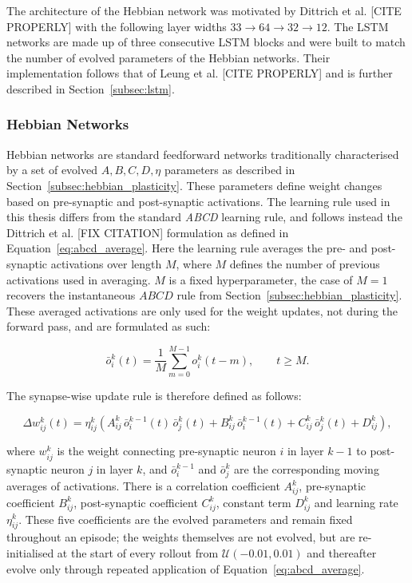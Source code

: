 \documentclass{article} %
\begin{document}
The architecture of the Hebbian network was motivated by Dittrich et al. [CITE PROPERLY] with the following layer widths $33 \rightarrow 64 \rightarrow 32 \rightarrow 12$. The LSTM networks are made up of three consecutive LSTM blocks and were built to match the number of evolved parameters of the Hebbian networks. Their implementation follows that of Leung et al. [CITE PROPERLY] and is further described in Section~\ref{subsec:lstm}.

\subsubsection{Hebbian Networks}
\label{subsec:hebbian_networks_methods}

Hebbian networks are standard feedforward networks traditionally characterised by a set of evolved $A,B,C,D,\eta$ parameters as described in Section~\ref{subsec:hebbian_plasticity}. These parameters define weight changes based on pre-synaptic and post-synaptic activations. The learning rule used in this thesis differs from the standard \textit{ABCD} learning rule, and follows instead the Dittrich et al. [FIX CITATION] formulation as defined in Equation~\ref{eq:abcd_average}. Here the learning rule averages the pre- and post-synaptic activations over length $M$, where $M$ defines the number of previous activations used in averaging. $M$ is a fixed hyperparameter, the case of $M=1$ recovers the instantaneous $ABCD$ rule from Section~\ref{subsec:hebbian_plasticity}. These averaged activations are only used for the weight updates, not during the forward pass, and are formulated as such:

\begin{equation}
\bar{o}_i^{k}(t) = \frac{1}{M} \sum_{m=0}^{M-1} o_i^{k}(t - m),
\qquad t \geq M.
\label{eq:movavg}
\end{equation}

The synapse-wise update rule is therefore defined as follows:

\begin{equation}
\Delta w_{ij}^{k}(t) = \eta_{ij}^{k}\left(
A_{ij}^{k}\, \bar{o}_i^{k-1}(t)\, \bar{o}_j^{k}(t)
+ B_{ij}^{k}\, \bar{o}_i^{k-1}(t)
+ C_{ij}^{k}\, \bar{o}_j^{k}(t)
+ D_{ij}^{k}\right),
\label{eq:abcd_average}
\end{equation}

where $w_{ij}^{k}$ is the weight connecting pre-synaptic neuron $i$ in layer
$k-1$ to post-synaptic neuron $j$ in layer $k$, and $\bar{o}_i^{k-1}$ and $\bar{o}_j^{k}$
are the corresponding moving averages of activations. There is a correlation coefficient $A_{ij}^{k}$, pre-synaptic coefficient $B_{ij}^{k}$, post-synaptic coefficient $C_{ij}^{k}$, constant term
$D_{ij}^{k}$ and learning rate $\eta_{ij}^{k}$. These five coefficients are the
evolved parameters and remain fixed throughout an episode; the weights
themselves are not evolved, but are re-initialised at the start of every
rollout from $\mathcal{U}(-0.01, 0.01)$ and thereafter evolve only through
repeated application of Equation~\ref{eq:abcd_average}. 
\end{document}
